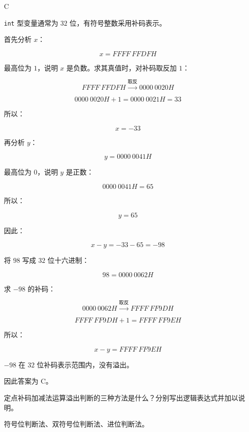 \begin{answer}
C
\end{answer}

\begin{analysisenv}
\texttt{int} 型变量通常为 $32$ 位，有符号整数采用补码表示。

首先分析 $x$：

\[
x = FFFF\ FFDFH
\]

最高位为 $1$，说明 $x$ 是负数。求其真值时，对补码取反加 $1$：

\[
FFFF\ FFDFH \xrightarrow{\text{取反}} 0000\ 0020H
\]

\[
0000\ 0020H + 1 = 0000\ 0021H = 33
\]

所以：

\[
x=-33
\]

再分析 $y$：

\[
y = 0000\ 0041H
\]

最高位为 $0$，说明 $y$ 是正数：

\[
0000\ 0041H = 65
\]

所以：

\[
y=65
\]

因此：

\[
x-y = -33 - 65 = -98
\]

将 $98$ 写成 $32$ 位十六进制：

\[
98 = 0000\ 0062H
\]

求 $-98$ 的补码：

\[
0000\ 0062H \xrightarrow{\text{取反}} FFFF\ FF9DH
\]

\[
FFFF\ FF9DH + 1 = FFFF\ FF9EH
\]

所以：

\[
x-y = FFFF\ FF9EH
\]

$-98$ 在 $32$ 位补码表示范围内，没有溢出。

因此答案为 C。
\end{analysisenv}


\begin{question}
定点补码加减法运算溢出判断的三种方法是什么？分别写出逻辑表达式并加以说明。
\end{question}

\begin{answer}
符号位判断法、双符号位判断法、进位判断法。
\end{answer}

